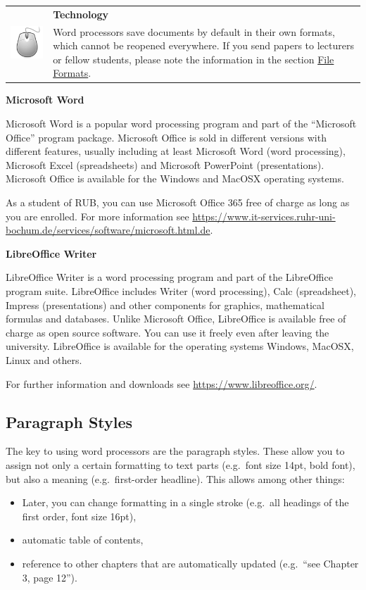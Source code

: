 \documentclass[
  english,
]{scrreprt}
\newlength{\iconwidth}
\newenvironment{displaybox}[2]{%
    \begin{center}
        \setlength\arrayrulewidth{0.75pt}%
        \arrayrulecolor{white}%
        \renewcommand{\arraystretch}{1.3}%
        \begin{tabular}{p{\iconwidth}p{\linewidth-4\tabcolsep-\iconwidth}}
            \multirow{2}{*}{#2}&\cellcolor{boxheadcol}\textbf{\sffamily\color{white}#1} \\%
            \hhline{~-}%
            &\cellcolor{boxcol}%
}{%
            \\
        \end{tabular}
        \arrayrulecolor{black}
    \end{center}
}
\newenvironment{Technology}{%
\begin{displaybox}{Technology}{\includegraphics[width=\iconwidth]{images/icon-technik}}}%
{\end{displaybox}}
\begin{document}
\begin{Technology}

Word processors save documents by default in their own formats, which cannot be reopened everywhere. If you send papers to lecturers or fellow students, please note the information in the section \hyperref[sec:file_formats]{File Formats}.

\end{Technology}

\textbf{Microsoft Word}

Microsoft Word is a popular word processing program and part of the “Microsoft Office” program package. Microsoft Office is sold in different versions with different features, usually including at least Microsoft Word (word processing), Microsoft Excel (spreadsheets) and Microsoft PowerPoint (presentations). Microsoft Office is available for the Windows and MacOSX operating systems.

As a student of RUB, you can use Microsoft Office 365 free of charge as long as you are enrolled. For more information see \url{https://www.it-services.ruhr-uni-bochum.de/services/software/microsoft.html.de}.

\textbf{LibreOffice Writer}

LibreOffice Writer is a word processing program and part of the LibreOffice program suite. LibreOffice includes Writer (word processing), Calc (spreadsheet), Impress (presentations) and other components for graphics, mathematical formulas and databases. Unlike Microsoft Office, LibreOffice is available free of charge as open source software. You can use it freely even after leaving the university. LibreOffice is available for the operating systems Windows, MacOSX, Linux and others.

For further information and downloads see \url{https://www.libreoffice.org/}.

\subsection{Paragraph Styles}\label{paragraph-styles}

The key to using word processors are the paragraph styles. These allow you to assign not only a certain formatting to text parts (e.g.~font size 14pt, bold font), but also a meaning (e.g.~first-order headline). This allows among other things:

\begin{itemize}
\item
  Later, you can change formatting in a single stroke (e.g.~all headings of the first order, font size 16pt),
\item
  automatic table of contents,
\item
  reference to other chapters that are automatically updated (e.g.~“see Chapter 3, page 12”).
\end{itemize}
\end{document}
